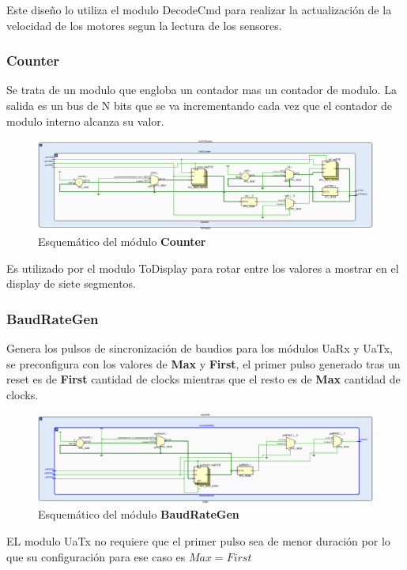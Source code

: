 \documentclass[12pt]{article}
\begin{document}
Este diseño lo utiliza el modulo DecodeCmd para realizar la actualización de la velocidad de los motores segun la lectura de los sensores.

\subsubsection{Counter}
Se trata de un modulo que engloba un contador mas un contador de modulo.
La salida es un bus de N bits que se va incrementando cada vez que el contador de modulo interno alcanza su valor.
\begin{figure}[H]
    \centering
    \includegraphics[width=\textwidth]{counter-crop}
    \caption{Esquemático del módulo \textbf{Counter}}
\end{figure}

Es utilizado por el modulo ToDisplay para rotar entre los valores a mostrar en el display de siete segmentos.

\subsubsection{BaudRateGen}
Genera los pulsos de sincronización de baudios para los módulos UaRx y UaTx, se preconfigura con los valores de \textbf{Max} y \textbf{First}, el primer pulso generado tras un reset es de \textbf{First} cantidad de clocks mientras que el resto es de \textbf{Max} cantidad de clocks.

\begin{figure}[H]
    \centering
    \includegraphics[width=\textwidth]{BaudRateGen-crop}
    \caption{Esquemático del módulo \textbf{BaudRateGen}}
\end{figure}

EL modulo UaTx no requiere que el primer pulso sea de menor duración por lo que su configuración para ese caso es $Max = First$
\end{document}
